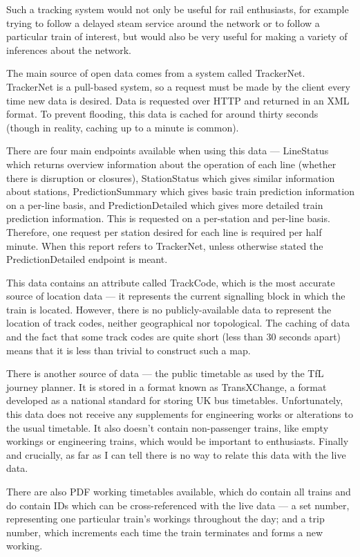 \documentclass[a4paper,12pt]{article}
\begin{document}
Such a tracking system would not only be useful for rail enthusiasts, for
example trying to follow a delayed steam service around the network or to
follow a particular train of interest, but would also be very useful for making
a variety of inferences about the network.

The main source of open data comes from a system called TrackerNet. TrackerNet
is a pull-based system, so a request must be made by the client every time new
data is desired. Data is requested over HTTP and returned in an XML format. To
prevent flooding, this data is cached for around thirty seconds (though in
reality, caching up to a minute is common).

There are four main endpoints available when using this data --- LineStatus
which returns overview information about the operation of each line (whether
there is disruption or closures), StationStatus which gives similar information
about stations, PredictionSummary which gives basic train prediction
information on a per-line basis, and PredictionDetailed which gives more
detailed train prediction information. This is requested on a per-station and
per-line basis\cite{TrackerNetSpec}. Therefore, one request per station desired
for each line is required per half minute. When this report refers to
TrackerNet, unless otherwise stated the PredictionDetailed endpoint is meant.

This data contains an attribute called TrackCode, which is the most accurate
source of location data --- it represents the current signalling block in which
the train is located. However, there is no publicly-available data to represent
the location of track codes, neither geographical nor topological. The caching
of data and the fact that some track codes are quite short (less than 30
seconds apart) means that it is less than trivial to construct such a map.

There is another source of data --- the public timetable as used by the TfL
journey planner. It is stored in a format known as TransXChange, a format
developed as a national standard for storing UK bus
timetables\cite{TransXChangeSpec}. Unfortunately, this data does not receive
any supplements for engineering works or alterations to the usual timetable. It
also doesn't contain non-passenger trains, like empty workings or engineering
trains, which would be important to enthusiasts. Finally and crucially, as far
as I can tell there is no way to relate this data with the live data.

There are also PDF working timetables available\cite{TfLWTT}, which do contain
all trains and do contain IDs which can be cross-referenced with the live data
--- a set number, representing one particular train's workings throughout the
day; and a trip number, which increments each time the train terminates and
forms a new working.
\end{document}
